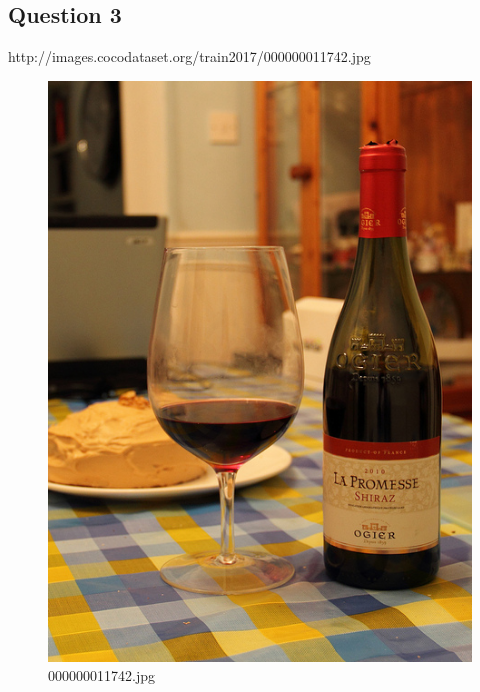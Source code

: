 \subsection*{Question 3}
http://images.cocodataset.org/train2017/000000011742.jpg
    \begin{figure}[h]
        \centering
        \includegraphics[width=0.8\linewidth]{../image set/easy/000000011742.jpg}
        \caption{000000011742.jpg}
    \end{figure}
